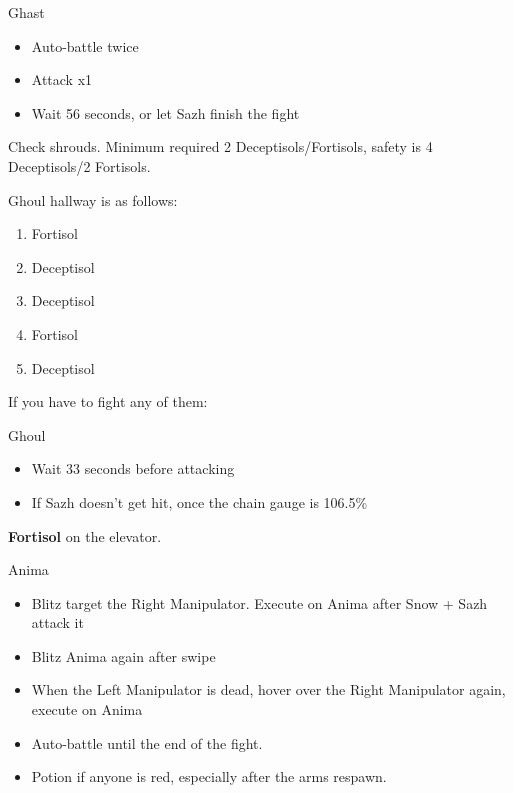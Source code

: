 \begin{battle}{Ghast}
\begin{itemize}
    \item Auto-battle twice
    \item Attack x1
    \item Wait 56 seconds, or let Sazh finish the fight
\end{itemize}
\end{battle}

Check shrouds. Minimum required 2 Deceptisols/Fortisols, safety is 4 Deceptisols/2 Fortisols.

Ghoul hallway is as follows:

\begin{enumerate}
    \item Fortisol
    \item Deceptisol
    \item Deceptisol
    \item Fortisol
    \item Deceptisol
\end{enumerate}

If you have to fight any of them:

\begin{battle}{Ghoul}
\begin{itemize}
    \item Wait 33 seconds before attacking
    \item If Sazh doesn't get hit, once the chain gauge is 106.5\%
\end{itemize}
\end{battle}

\textbf{Fortisol} on the elevator.

\begin{battle}{Anima}
\begin{itemize}
    \item Blitz target the Right Manipulator. Execute on Anima after Snow + Sazh attack it
    \item Blitz Anima again after swipe
    \item When the Left Manipulator is dead, hover over the Right Manipulator again, execute on Anima
    \item Auto-battle until the end of the fight.
    \item Potion if anyone is red, especially after the arms respawn.
\end{itemize}
\end{battle}


